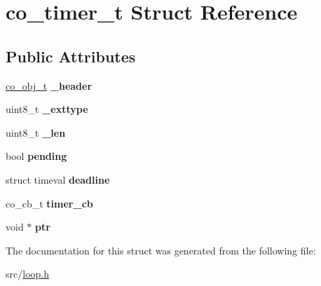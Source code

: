 \hypertarget{structco__timer__t}{\section{co\-\_\-timer\-\_\-t Struct Reference}
\label{structco__timer__t}
}
\subsection*{Public Attributes}
\begin{DoxyCompactItemize}
\item 
\hypertarget{structco__timer__t_a9b3934ba6edc38723af67f0fc92e9a2c}{\hyperlink{structco__obj__t}{co\-\_\-obj\-\_\-t} {\bfseries \-\_\-header}}\label{structco__timer__t_a9b3934ba6edc38723af67f0fc92e9a2c}

\item 
\hypertarget{structco__timer__t_a8d79bc02e9dcf8d7ef63ca06fd5fd6c6}{uint8\-\_\-t {\bfseries \-\_\-exttype}}\label{structco__timer__t_a8d79bc02e9dcf8d7ef63ca06fd5fd6c6}

\item 
\hypertarget{structco__timer__t_a854a227a7bc03660c299d8220af85c44}{uint8\-\_\-t {\bfseries \-\_\-len}}\label{structco__timer__t_a854a227a7bc03660c299d8220af85c44}

\item 
\hypertarget{structco__timer__t_ac476be185219f9890183741d912e8c4c}{bool {\bfseries pending}}\label{structco__timer__t_ac476be185219f9890183741d912e8c4c}

\item 
\hypertarget{structco__timer__t_ad058d8b24527bfb3de079906b344ff43}{struct timeval {\bfseries deadline}}\label{structco__timer__t_ad058d8b24527bfb3de079906b344ff43}

\item 
\hypertarget{structco__timer__t_a1d01faa89e52531b3d36d92dbd872847}{co\-\_\-cb\-\_\-t {\bfseries timer\-\_\-cb}}\label{structco__timer__t_a1d01faa89e52531b3d36d92dbd872847}

\item 
\hypertarget{structco__timer__t_af90e50601e8555239865b3294033b202}{void $\ast$ {\bfseries ptr}}\label{structco__timer__t_af90e50601e8555239865b3294033b202}

\end{DoxyCompactItemize}


The documentation for this struct was generated from the following file\-:\begin{DoxyCompactItemize}
\item 
src/\hyperlink{loop_8h}{loop.\-h}\end{DoxyCompactItemize}
